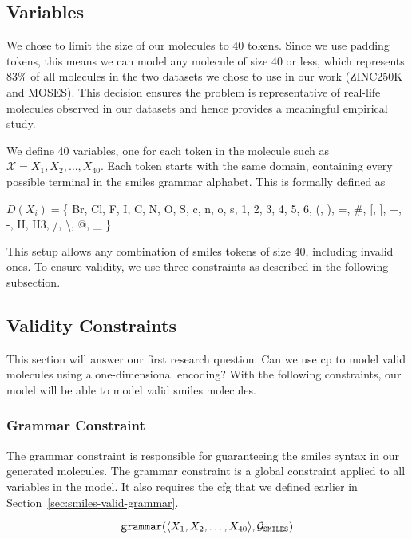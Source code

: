 \documentclass[../Document.tex]{subfiles}
\begin{document}
\subsection{Variables}
We chose to limit the size of our molecules to 40 tokens. Since we use padding tokens, this means we can model any molecule of size 40 or less, which represents 83\% of all molecules in the two datasets we chose to use in our work (ZINC250K and MOSES).
This decision ensures the problem is representative of real-life molecules observed in our datasets and hence provides a meaningful empirical study.

We define 40 variables, one for each token in the molecule such as $\mathcal{X} = {X_1, X_2, \dots, X_{40}}$. Each token starts with the same domain, containing every possible terminal in the \gls{smiles} grammar alphabet.
This is formally defined as 
\begin{center}
$D(X_i) = $\{
    Br, Cl, F, I, C, N, O, S, c, n, o, s, 1, 2, 3, 4, 5, 6, (, ), =, \#, [, ], +, -, H, H3, /, \textbackslash, @, \_
\}
\end{center}

This setup allows any combination of \gls{smiles} tokens of size 40, including invalid ones. To ensure validity, we use three constraints as described in the following subsection.


\subsection{Validity Constraints}
\label{sec:validity-constraint-definition}
This section will answer our first research question: Can we use \acrshort{cp} to model valid molecules using a one-dimensional encoding?
With the following constraints, our model will be able to model valid \gls{smiles} molecules.

\subsubsection{Grammar Constraint}
The grammar constraint is responsible for guaranteeing the \gls{smiles} syntax in our generated molecules. The grammar constraint is a global constraint applied to all variables in the model. It also requires the \gls{cfg} that we defined earlier in Section~\ref{sec:smiles-valid-grammar}.

$$
    \texttt{grammar}(\langle X_1, X_2, \ldots, X_{40} \rangle, \mathcal{G}_{\texttt{SMILES}})\\
$$
\end{document}
